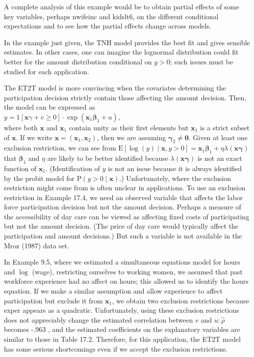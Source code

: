\documentclass[10pt]{article}
\begin{document}
A complete analysis of this example would be to obtain partial effects of some key variables, perhaps nwifeinc and kidslt6, on the different conditional expectations and to see how the partial effects change across models.

In the example just given, the TNH model provides the best fit and gives sensible estimates. In other cases, one can imagine the lognormal distribution could fit better for the amount distribution conditional on $y>0$; such issues must be studied for each application.

The ET2T model is more convincing when the covariates determining the participation decision strictly contain those affecting the amount decision. Then, the model can be expressed as\\
$y=1[\mathbf{x} \gamma+v \geq 0] \cdot \exp \left(\mathbf{x}_{1} \boldsymbol{\beta}_{1}+u\right)$,\\
where both $\mathbf{x}$ and $\mathbf{x}_{1}$ contain unity as their first elements but $\mathbf{x}_{1}$ is a strict subset of $\mathbf{x}$. If we write $\mathbf{x}=\left(\mathbf{x}_{1}, \mathbf{x}_{2}\right)$, then we are assuming $\boldsymbol{\gamma}_{2} \neq \mathbf{0}$. Given at least one exclusion restriction, we can see from $\mathrm{E}[\log (y) \mid \mathbf{x}, y>0]=\mathbf{x}_{1} \boldsymbol{\beta}_{1}+\eta \lambda(\mathbf{x} \boldsymbol{\gamma})$ that $\boldsymbol{\beta}_{1}$ and $\eta$ are likely to be better identified because $\lambda(\mathbf{x} \boldsymbol{\gamma})$ is not an exact function of $\mathbf{x}_{1}$. (Identification of $y$ is not an issue because it is always identified by the probit model for $\mathrm{P}(y>0 \mid \mathbf{x})$.) Unfortunately, where the exclusion restriction might come from is often unclear in applications. To use an exclusion restriction in Example 17.4, we need an observed variable that affects the labor force participation decision but not the amount decision. Perhaps a measure of the accessibility of day care can be viewed as affecting fixed costs of participating but not the amount decision. (The price of day care would typically affect the participation and amount decisions.) But such a variable is not available in the Mroz (1987) data set.

In Example 9.5, where we estimated a simultaneous equations model for hours and $\log$ (wage), restricting ourselves to working women, we assumed that past workforce experience had no affect on hours; this allowed us to identify the hours equation. If we make a similar assumption and allow experience to affect participation but exclude it from $\mathbf{x}_{1}$, we obtain two exclusion restrictions because exper appears as a quadratic. Unfortunately, using these exclusion restrictions does not appreciably change the estimated correlation between $v$ and $u: \hat{\rho}$ becomes -.963 , and the estimated coefficients on the explanatory variables are similar to those in Table 17.2. Therefore, for this application, the ET2T model has some serious shortcomings even if we accept the exclusion restrictions.
\end{document}
